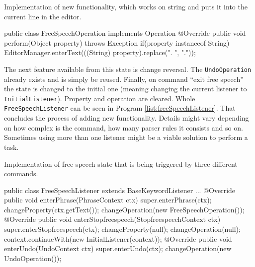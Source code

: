 \begin{program}[hbt!]
    \caption{Implementation of new functionality, which works on string and puts it into the current line in the editor.}
    \label{list:freeSpeechOperation}
    \begin{JavaCode}
public class FreeSpeechOperation implements Operation {
	@Override
	public void perform(Object property) throws Exception {
		if(property instanceof String) {
		    EditorManager.enterText(((String) property).replace(". ", "."));
		}
	}
}  \end{JavaCode}
\end{program}

The next feature available from this state is change reversal. The \texttt{UndoOperation} already exists and is simply be reused. Finally, on command ``exit free speech'' the state is changed to the initial one (meaning changing the current listener to \texttt{InitialListener}). Property and operation are cleared. Whole \texttt{FreeSpeechListener} can be seen in Program \ref{list:freeSpeechListener}. That concludes the process of adding new functionality. Details might vary depending on how complex is the command, how many parser rules it consists and so on. Sometimes using more than one listener might be a viable solution to perform a task. 
\begin{program} [hbt!]
    \caption{Implementation of free speech state that is being triggered by three different commands.}
    \label{list:freeSpeechListener}
    \begin{JavaCode}
public class FreeSpeechListener extends BaseKeywordListener {
    ...
	@Override
	public void enterPhrase(PhraseContext ctx) {
		super.enterPhrase(ctx);
		changeProperty(ctx.getText());
		changeOperation(new FreeSpeechOperation());
	}
	@Override
	public void enterStopfreespeech(StopfreespeechContext ctx) {
		super.enterStopfreespeech(ctx);
		changeProperty(null);
		changeOperation(null);
		context.continueWith(new InitialListener(context));
	}
	@Override
	public void enterUndo(UndoContext ctx) {
		super.enterUndo(ctx);
		changeOperation(new UndoOperation());
	}
} \end{JavaCode}
\end{program}

